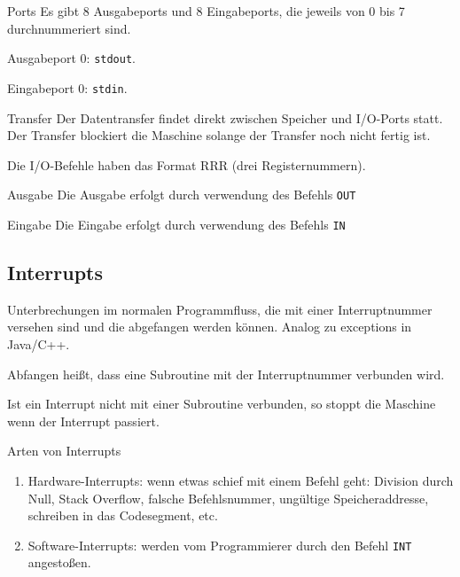 \begin{frame}{Ports}
 Es gibt 8 Ausgabeports und 8 Eingabeports, die jeweils von 0 bis 7
 durchnummeriert sind.
 
 Ausgabeport 0: \texttt{stdout}.
 
 Eingabeport 0: \texttt{stdin}.
\end{frame}


\begin{frame}{Transfer}
 Der Datentransfer findet direkt zwischen Speicher und I/O-Ports statt.
 Der Transfer blockiert die Maschine solange der Transfer noch nicht fertig ist.
 
 Die I/O-Befehle haben das Format RRR (drei Registernummern).
\end{frame}


\begin{frame}{Ausgabe}
 Die Ausgabe erfolgt durch verwendung des Befehls \texttt{OUT}
 \begin{center}
  
 \end{center}
\end{frame}


\begin{frame}{Eingabe}
 Die Eingabe erfolgt durch verwendung des Befehls \texttt{IN}
 \begin{center}
  
 \end{center}
\end{frame}


\subsection{Interrupts}

\begin{frame}{\insertsubsection}
 Unterbrechungen im normalen Programmfluss, die mit einer Interruptnummer
 versehen sind und die abgefangen werden können. 
 Analog zu \glqq exceptions\grqq{} in Java/C++.
 
 Abfangen heißt, dass eine Subroutine mit der Interruptnummer verbunden wird.
 
 Ist ein Interrupt nicht mit einer Subroutine verbunden, so stoppt die Maschine
 wenn der Interrupt passiert.
\end{frame}



\begin{frame}{Arten von Interrupts}
 \begin{enumerate}
  \item Hardware-Interrupts: wenn etwas schief mit einem Befehl geht:
        Division durch Null, Stack Overflow, falsche Befehlsnummer, ungültige
        Speicheraddresse, schreiben in das Codesegment, etc.
  \item Software-Interrupts: werden vom Programmierer durch den Befehl 
        \texttt{INT} angestoßen.
 \end{enumerate}
\end{frame}


